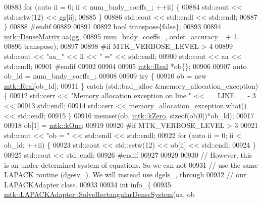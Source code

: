 \begin{DoxyCode}
{{00883       \textcolor{keywordflow}{for} (\textcolor{keyword}{auto} ii = 0; ii < num\_bndy\_coeffs\_; ++ii) \{
00884         std::cout << std::setw(12) << gg[ii];
00885       \}
00886       std::cout << std::endl << std::endl;
00887     \}
00888 \textcolor{preprocessor}{    #endif}
00889 
00891 
00892     \textcolor{keywordtype}{bool} transpose\{\textcolor{keyword}{false}\};
00893 
00894     \hyperlink{classmtk_1_1DenseMatrix}{mtk::DenseMatrix} aa(gg,
00895                          num\_bndy\_coeffs\_, order\_accuracy\_ + 1,
00896                          transpose);
00897 
00898 \textcolor{preprocessor}{    #if MTK\_VERBOSE\_LEVEL > 4}
00899     std::cout << \textcolor{stringliteral}{"aa\_"} << ll << \textcolor{stringliteral}{" ="} << std::endl;
00900     std::cout << aa << std::endl;
00901 \textcolor{preprocessor}{    #endif}
00902 
00904 
00905     \hyperlink{group__c01-roots_gac080bbbf5cbb5502c9f00405f894857d}{mtk::Real} *ob\{\};
00906 
00907     \textcolor{keyword}{auto} ob\_ld = num\_bndy\_coeffs\_;
00908 
00909     \textcolor{keywordflow}{try} \{
00910       ob = \textcolor{keyword}{new} \hyperlink{group__c01-roots_gac080bbbf5cbb5502c9f00405f894857d}{mtk::Real}[ob\_ld];
00911     \} \textcolor{keywordflow}{catch} (std::bad\_alloc &memory\_allocation\_exception) \{
00912       std::cerr << \textcolor{stringliteral}{"Memory allocation exception on line "} << \_\_LINE\_\_ - 3 <<
00913         std::endl;
00914       std::cerr << memory\_allocation\_exception.what() << std::endl;
00915     \}
00916     memset(ob, \hyperlink{group__c01-roots_ga59a451a5fae30d59649bcda274fea271}{mtk::kZero}, \textcolor{keyword}{sizeof}(ob[0])*ob\_ld);
00917 
00918     ob[1] = \hyperlink{group__c01-roots_ga26407c24d43b6b95480943340d285c71}{mtk::kOne};
00919 
00920 \textcolor{preprocessor}{    #if MTK\_VERBOSE\_LEVEL > 3}
00921     std::cout << \textcolor{stringliteral}{"ob = "} << std::endl << std::endl;
00922     \textcolor{keywordflow}{for} (\textcolor{keyword}{auto} ii = 0; ii < ob\_ld; ++ii) \{
00923       std::cout << std::setw(12) << ob[ii] << std::endl;
00924     \}
00925     std::cout << std::endl;
00926 \textcolor{preprocessor}{    #endif}
00927 
00929 
00930     \textcolor{comment}{// However, this is an under-determined system of equations. So we can not}
00931     \textcolor{comment}{// use the same LAPACK routine (dgesv\_). We will instead use dgels\_, through}
00932     \textcolor{comment}{// our LAPACKAdapter class.}
00933 
00934     \textcolor{keywordtype}{int} info\_\{
00935       \hyperlink{classmtk_1_1LAPACKAdapter_a380f148ffdf96bae2f79ae28f1a6560c}{mtk::LAPACKAdapter::SolveRectangularDenseSystem}(aa, ob
}}
\end{DoxyCode}
